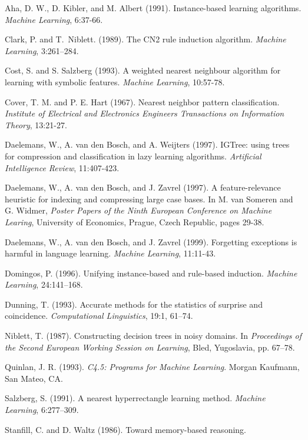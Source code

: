 \documentclass[11pt]{article}
\begin{document}
\begin{description}
\item
  Aha, D. W., D. Kibler, and M. Albert (1991). Instance-based 
    learning algorithms. {\em Machine Learning}, 6:37-66.
\item
  Clark, P. and T.~Niblett. (1989). The {CN}2 rule induction algorithm.
    {\em Machine Learning}, 3:261--284.
\item
  Cost, S. and S. Salzberg (1993). A weighted nearest neighbour 
    algorithm for learning with symbolic features.
    {\em Machine Learning}, 10:57-78.
\item
  Cover, T. M. and P. E. Hart (1967). Nearest neighbor pattern 
    classification. {\em Institute of Electrical and Electronics 
    Engineers Transactions on Information Theory}, 13:21-27.
\item
  Daelemans, W., A. van den Bosch, and A. Weijters (1997). IGTree: 
    using trees for compression and classification in lazy learning 
    algorithms. {\em Artificial Intelligence Review}, 11:407-423.
\item
  Daelemans, W., A. van den Bosch, and J. Zavrel (1997). A 
    feature-relevance heuristic for indexing and compressing large 
    case bases. In M. van Someren and G. Widmer, {\em Poster Papers of 
    the Ninth European Conference on Machine Learing}, University of 
    Economics, Prague, Czech Republic, pages 29-38.
\item
  Daelemans, W., A. van den Bosch, and J. Zavrel (1999).
    Forgetting exceptions is harmful in language learning.
    {\em Machine Learning}, 11:11-43.
\item
  Domingos, P. (1996). Unifying instance-based and rule-based induction.
    {\em Machine Learning}, 24:141--168.
\item
  Dunning, T. (1993). Accurate methods for the statistics of surprise 
    and coincidence. {\em Computational Linguistics}, 19:1, 61--74.
\item
  Niblett, T. (1987). Constructing decision trees in noisy domains.
    In {\em Proceedings of the Second European Working Session on
    Learning}, Bled, Yugoslavia, pp. 67--78.
\item
  Quinlan, J. R. (1993). {\em C4.5: Programs for Machine Learning}.
    Morgan Kaufmann, San Mateo, CA.
\item
  Salzberg, S. (1991). A nearest hyperrectangle learning method.
    {\em Machine Learning}, 6:277--309.
\item
  Stanfill, C. and D. Waltz (1986). Toward memory-based reasoning.

\end{description}
\end{document}
